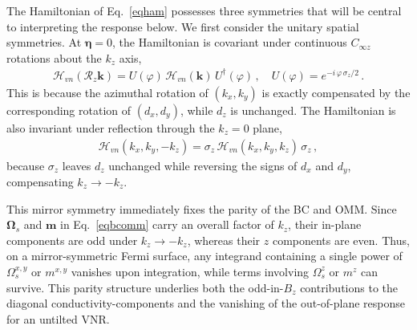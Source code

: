 \documentclass[aps,prb,onecolumn,nofootinbib,citeautoscript,10pt]{revtex4-2}
\newcommand{\bs}[1]{\boldsymbol{#1}}
\begin{document}
The Hamiltonian of Eq.~\eqref{eqham} possesses three symmetries that will be central to interpreting the response below. We first consider the unitary spatial symmetries. At $\bs\eta=0$, the Hamiltonian is covariant under continuous $C_{\infty z}$ rotations about the $k_z$ axis,
\begin{align}
\mathcal H_{vn}(\mathcal R_z\bs k)
=U(\varphi)\,\mathcal H_{vn}(\bs k)\,U^\dagger(\varphi)\,, \quad
U(\varphi)=e^{-i\,\varphi\,\sigma_z/2}\,.
\end{align}
This is because the azimuthal rotation of $(k_x,k_y)$ is exactly compensated by the corresponding rotation of $(d_x,d_y)$, while $d_z$ is unchanged. The Hamiltonian is also invariant under reflection through the $k_z=0$ plane,
\begin{align}
\mathcal H_{vn}(k_x,k_y,-k_z)=\sigma_z\,\mathcal H_{vn}(k_x,k_y,k_z)\,\sigma_z\,,
\end{align}
because $\sigma_z$ leaves $d_z$ unchanged while reversing the signs of $d_x$ and $d_y$, compensating $k_z\to-k_z$.

This mirror symmetry immediately fixes the parity of the BC and OMM. Since $\bs\Omega_s$ and $\boldsymbol m$ in Eq.~\eqref{eqbcomm} carry an overall factor of $k_z$, their in-plane components are odd under $k_z\to-k_z$, whereas their $z$ components are even. Thus, on a mirror-symmetric Fermi surface, any integrand containing a single power of $\Omega_s^{x,y}$ or $m^{x,y}$ vanishes upon integration, while terms involving $\Omega_s^z$ or $m^z$ can survive. This parity structure underlies both the odd-in-$B_z$ contributions to the diagonal conductivity-components and the vanishing of the out-of-plane response for an untilted VNR.
\end{document}
